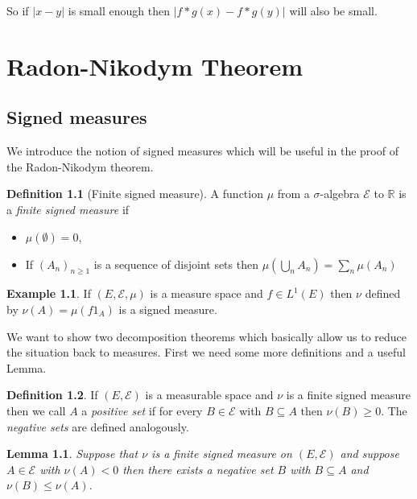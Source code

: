 \documentclass[
]{book}
\providecommand{\tightlist}{%
  \setlength{\itemsep}{0pt}\setlength{\parskip}{0pt}}
\newtheorem{lemma}{Lemma}[chapter]
\theoremstyle{definition}
\newtheorem{definition}{Definition}[chapter]
\theoremstyle{definition}
\newtheorem{example}{Example}[chapter]
\theoremstyle{definition}
\theoremstyle{definition}
\theoremstyle{remark}
\begin{document}
So if \(|x-y|\) is small enough then \(|f*g(x) - f*g(y)|\) will also be small.

\hypertarget{radon-nikodym-theorem}{%
\chapter{Radon-Nikodym Theorem}\label{radon-nikodym-theorem}}

\hypertarget{signed-measures}{%
\section{Signed measures}\label{signed-measures}}

We introduce the notion of signed measures which will be useful in the proof of the Radon-Nikodym theorem.

\begin{definition}[Finite signed measure]

A function \(\mu\) from a \(\sigma\)-algebra \(\mathcal{E}\) to \(\mathbb{R}\) is a \emph{finite signed measure} if

\begin{itemize}
\tightlist
\item
  \(\mu(\emptyset) = 0\),
\item
  If \((A_n)_{n \geq 1}\) is a sequence of disjoint sets then \(\mu (\bigcup_n A_n) = \sum_n \mu(A_n)\)
\end{itemize}

\end{definition}

\begin{example}
If \((E, \mathcal{E}, \mu)\) is a measure space and \(f \in L^1(E)\) then \(\nu\) defined by \(\nu(A) = \mu(f1_A)\) is a signed measure.
\end{example}

We want to show two decomposition theorems which basically allow us to reduce the situation back to measures. First we need some more definitions and a useful Lemma.

\begin{definition}
If \((E, \mathcal{E})\) is a measurable space and \(\nu\) is a finite signed measure then we call \(A\) a \emph{positive set} if for every \(B \in \mathcal{E}\) with \(B \subseteq A\) then \(\nu(B) \geq 0\). The \emph{negative sets} are defined analogously.
\end{definition}

\begin{lemma}
Suppose that \(\nu\) is a finite signed measure on \((E, \mathcal{E})\) and suppose \(A \in \mathcal{E}\) with \(\nu(A) <0\) then there exists a negative set \(B\) with \(B \subseteq A\) and \(\nu(B) \leq \nu(A)\).
\end{lemma}
\end{document}
